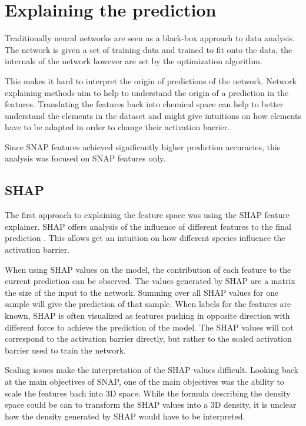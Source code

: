 \section{Explaining the prediction}

Traditionally neural networks are seen as a black-box approach to data analysis.
The network is given a set of training data and trained to fit onto the data,
the internals of the network however are set by the optimization algorithm.

This makes it hard to interpret the origin of predictions of the network.
Network explaining methods aim to help to understand the origin of a prediction in the features.
Translating the features back into chemical space can help to better understand 
the elements in the dataset and might give intuitions on how elements have to be adapted in order to change their activation barrier.

Since SNAP features achieved significantly higher prediction accuracies,
this analysis was focused on SNAP features only.

\subsection{SHAP}

The first approach to explaining the feature space was using the SHAP feature explainer.
SHAP offers analysis of the influence of different features to the final prediction \cite{NIPS2017_7062}.
This allows get an intuition on how different species influence the activation barrier.

When using SHAP values on the model, the contribution of each feature to the current prediction can be observed.
The values generated by SHAP are a matrix the size of the input to the network.
Summing over all SHAP values for one sample will give the prediction of that sample.
When labels for the features are  known, SHAP is often visualized as features pushing in opposite direction with different force 
to achieve the prediction of the model.
The SHAP values will not correspond to the activation barrier directly,
but rather to the scaled activation barrier used to train the network.

Scaling issues make the interpretation of the SHAP values difficult.
Looking back at the main objectives of SNAP, one of the main objectives was the ability to scale the features bach into 3D space.
While the formula describing the density space could be can to transform the SHAP values 
into a 3D density, it is unclear how the density generated by SHAP would have to be interpreted.


